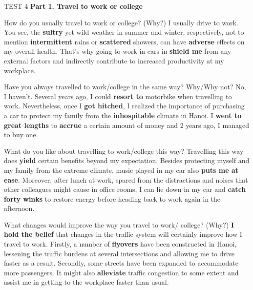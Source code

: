 \begin{glossarymc}[Cambridge 7]
    \begin{test}{TEST 4}
    \noindent
    \textbf{Part 1. Travel to work or college}
    \begin{qa}{How do you usually travel to work or college? (Why?)}
    I usually drive to work. You see, the \textbf{sultry} yet wild weather in summer and winter, respectively, not to mention \textbf{intermittent} rains or \textbf{scattered} showers, can have \textbf{adverse} effects on my overall health. That's why going to work in cars in \textbf{shield me} from any external factors and indirectly contribute to increased productivity at my workplace.
    \end{qa}

    \begin{qa}{Have you always travelled to work/college in the same way? Why/Why not?}
    No, I haven't. Several years ago, I could \textbf{resort to} motorbike when travelling to work. Nevertheless, once I \textbf{got hitched}, I realized the importance of purchasing a car to protect my family from the \textbf{inhospitable} climate in Hanoi. I \textbf{went to great lengths} to \textbf{accrue} a certain amount of money and 2 years ago, I managed to buy one.
    \end{qa}

    \begin{qa}{What do you like about travelling to work/college this way?}
    Travelling this way does \textbf{yield} certain benefits beyond my expectation. Besides protecting myself and my family from the extreme climate, music played in my car also \textbf{puts me at ease}. Moreover, after lunch at work, spared from the distractions and noises that other colleagues might cause in office rooms, I can lie down in my car and \textbf{catch forty winks} to restore energy before heading back to work again in the afternoon.
    \end{qa}

    \begin{qa}{What changes would improve the way you travel to work/ college? (Why?)}
    \textbf{I hold the belief} that changes in the traffic system will certainly improve how I travel to work. Firstly, a number of \textbf{flyovers} have been constructed in Hanoi, lessening the traffic burdens at several intersections and allowing me to drive faster as a result. Secondly, some streets have been expanded to accommodate more passengers. It might also \textbf{alleviate} traffic congestion to some extent and assist me in getting to the workplace faster than usual.
    \end{qa}


\end{test}
\end{glossarymc}
